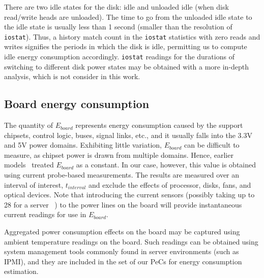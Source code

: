 \documentclass[acmtaco]{acmtrans2m}
\begin{document}
There are two idle states for the disk: idle and unloaded idle (when
disk read/write heads are unloaded).  The time to go from the unloaded
idle state to the idle state is usually less than 1 second (smaller than
the resolution of \texttt{iostat}).  Thus, a history match count in the
\texttt{iostat} statistics with zero reads and writes signifies the
periods in which the disk is idle, permitting us to compute idle energy
consumption accordingly.  \texttt{iostat} readings for the durations of
switching to different disk power states may be obtained with a more
in-depth analysis, which is not consider in this work.
\subsection{Board energy consumption}
\label{sec:board}
The quantity of $E_{board}$ represents energy consumption caused by the
support chipsets, control logic, buses, signal links, etc., and it
usually falls into the 3.3V and 5V power domains.  Exhibiting little
variation, $E_{board}$ can be difficult to measure, as chipset power is
drawn from multiple domains.  Hence, earlier
models~\cite{Kansal2010,Bircher2011} treated $E_{board}$ as a
constant. In our case, however, this value is obtained using current
probe-based measurements.  The results are measured over an interval of
interest, $t_{interval}$ and exclude the effects of processor, disks,
fans, and optical devices.  Note that introducing the current sensors
(possibly taking up to 28 for a server ~\cite{SSI2004}) to the power
lines on the board will provide instantaneous current readings for use
in $E_{board}$.

Aggregated power consumption effects on the board may be captured using
ambient temperature readings on the board.  Such readings can be
obtained using system management tools commonly found in server
environments (such as IPMI), and they are included in the set of our PeCs
for energy consumption estimation.
\end{document}
